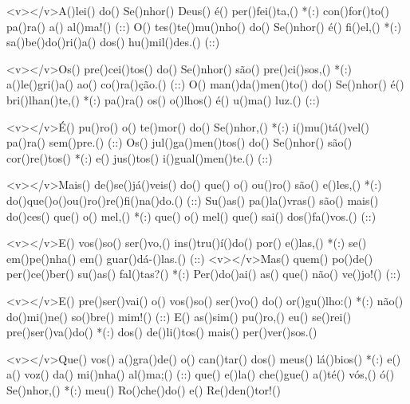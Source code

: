 <v></v>A()lei() do() Se()nhor() Deus() é() per()fei()ta,() *(:)
con()for()to() pa()ra() a() al()ma!() (::)
O() tes()te()mu()nho() do() Se()nhor() é() fi()el,() *(:)
sa()be()do()ri()a() dos() hu()mil()des.() (::)

<v></v>Os() pre()cei()tos() do() Se()nhor() são() pre()ci()sos,() *(:)
a()le()gri()a() ao() co()ra()ção.() (::)
O() man()da()men()to() do() Se()nhor() é() bri()lhan()te,() *(:)
pa()ra() os() o()lhos() é() u()ma() luz.() (::)

<v></v>É() pu()ro() o() te()mor() do() Se()nhor,() *(:)
i()mu()tá()vel() pa()ra() sem()pre.() (::)
Os() jul()ga()men()tos() do() Se()nhor() são() cor()re()tos() *(:)
e() jus()tos() i()gual()men()te.() (::)

<v></v>Mais() de()se()já()veis() do() que() o() ou()ro() são() e()les,() *(:)
do()que()o()ou()ro()re()fi()na()do.() (::)
Su()as() pa()la()vras() são() mais() do()ces() que() o() mel,() *(:)
que() o() mel() que() sai() dos()fa()vos.() (::)

<v></v>E() vos()so() ser()vo,() ins()tru()í()do() por() e()las,() *(:)
se() em()pe()nha() em() guar()dá-()las.() (::)
<v></v>Mas() quem() po()de() per()ce()ber() su()as() fal()tas?() *(:)
Per()do()ai() as() que() não() ve()jo!() (::)

<v></v>E() pre()ser()vai() o() vos()so() ser()vo() do() or()gu()lho:() *(:)
não() do()mi()ne() so()bre() mim!() (::)
E() as()sim() pu()ro,() eu() se()rei() pre()ser()va()do() *(:)
dos() de()li()tos() mais() per()ver()sos.()

<v></v>Que() vos() a()gra()de() o() can()tar() dos() meus() lá()bios() *(:)
e() a() voz() da() mi()nha() al()ma;() (::)
que() e()la() che()gue() a()té() vós,() ó() Se()nhor,() *(:)
meu() Ro()che()do() e() Re()den()tor!()